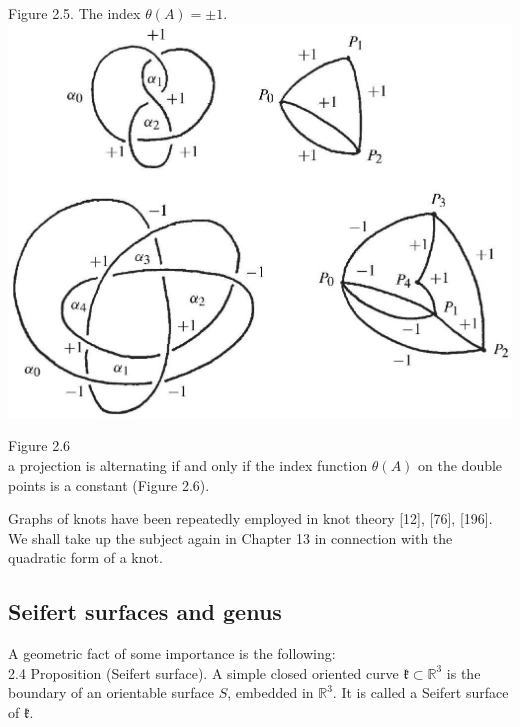 \documentclass[10pt, letterpaper]{article}
\begin{document}
Figure 2.5. The index $\theta(A)= \pm 1$.\\
\includegraphics[scale=0.2, center]{2025_05_21_9c06be8de7a55410f8c1g-033}

Figure 2.6\\
a projection is alternating if and only if the index function $\theta(A)$ on the double points is a constant (Figure 2.6).

Graphs of knots have been repeatedly employed in knot theory [12], [76], [196]. We shall take up the subject again in Chapter 13 in connection with the quadratic form of a knot.

\subsection{Seifert surfaces and genus}
A geometric fact of some importance is the following:\\
2.4 Proposition (Seifert surface). A simple closed oriented curve $\mathfrak{k} \subset \mathbb{R}^{3}$ is the boundary of an orientable surface $S$, embedded in $\mathbb{R}^{3}$. It is called a Seifert surface of $\mathfrak{k}$.
\end{document}
